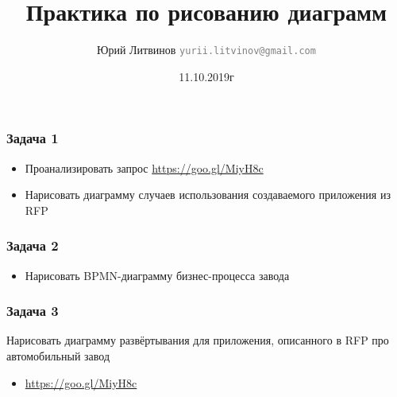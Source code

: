 \documentclass[xetex,mathserif,serif]{beamer}
\title{Практика по рисованию диаграмм}
\author[Юрий Литвинов]{Юрий Литвинов \newline \textcolor{gray}{\small\texttt{yurii.litvinov@gmail.com}}}
\date{11.10.2019г}
\begin{document}
	
	\frame{\titlepage}

	\begin{frame}
		\frametitle{Задача 1}
		\begin{itemize}
			\item Проанализировать запрос \url{https://goo.gl/MiyH8c}
			\item Нарисовать диаграмму случаев использования создаваемого приложения из RFP
		\end{itemize}
	\end{frame}

	\begin{frame}
		\frametitle{Задача 2}
		\begin{itemize}
			\item Нарисовать BPMN-диаграмму бизнес-процесса завода
		\end{itemize}
	\end{frame}

	\begin{frame}
		\frametitle{Задача 3}
		Нарисовать диаграмму развёртывания для приложения, описанного в RFP про автомобильный завод
		\begin{itemize}
			\item \url{https://goo.gl/MiyH8c}
		\end{itemize}
	\end{frame}
\end{document}
